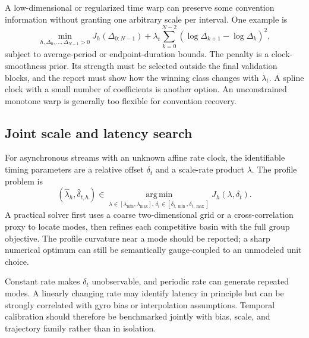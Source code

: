 \documentclass[11pt]{article}
\newcommand{\argmin}{\operatorname*{arg\,min}}
\begin{document}
    A low-dimensional or regularized time warp can preserve some convention information
    without granting one arbitrary scale per interval. One example is
    \begin{equation}
        \min_{h,\Delta_0,\ldots,\Delta_{N-1}>0}
        J_h(\Delta_{0:N-1})
        +\lambda_t\sum_{k=0}^{N-2}
        \left(\log\Delta_{k+1}-\log\Delta_k\right)^2,
        \label{eq:regularized-time-warp}
    \end{equation}
    subject to average-period or endpoint-duration bounds. The penalty is a clock-smoothness
    prior. Its strength must be selected outside the final validation blocks, and the report
    must show how the winning class changes with $\lambda_t$. A spline clock with a small
    number of coefficients is another option. An unconstrained monotone warp is generally
    too flexible for convention recovery.

    \subsection{Joint scale and latency search}

    For asynchronous streams with an unknown affine rate clock, the identifiable timing
    parameters are a relative offset $\delta_t$ and a scale-rate product $\lambda$. The profile
    problem is
    \begin{equation}
        (\widehat\lambda_h,\widehat\delta_{t,h})
    \in\argmin_{\lambda\in[\lambda_{\min},\lambda_{\max}],\,
    \delta_t\in[\delta_{t,\min},\delta_{t,\max}]}
    J_h(\lambda,\delta_t).
    \label{eq:joint-scale-latency}
    \end{equation}
    A practical solver first uses a coarse two-dimensional grid or a cross-correlation proxy
    to locate modes, then refines each competitive basin with the full group objective. The
    profile curvature near a mode should be reported; a sharp numerical optimum can still be
    semantically gauge-coupled to an unmodeled unit choice.

    Constant rate makes $\delta_t$ unobservable, and periodic rate can generate repeated modes.
    A linearly changing rate may identify latency in principle but can be strongly correlated
    with gyro bias or interpolation assumptions. Temporal calibration should therefore be
    benchmarked jointly with bias, scale, and trajectory family rather than in isolation.
\end{document}
